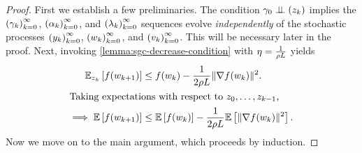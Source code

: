 \estimatingSequenceBound*
\begin{proof}
    First we establish a few preliminaries.
    The condition \( \gamma_0 \perp \!\!\! \perp \left(z_{k}\right) \) implies the \( \left(\gamma_k\right)_{k=0}^\infty \), \( \left(\alpha_k\right)_{k=0}^\infty \), and \( \left(\lambda_k\right)_{k=0}^\infty \) sequences evolve \emph{independently} of the stochastic processes \( \left(y_k\right)_{k=0}^\infty \), \( \left(w_k\right)_{k=0}^\infty \), and \( \left(v_k\right)_{k=0}^\infty \).
    This will be necessary later in the proof.
    Next, invoking \autoref{lemma:sgc-decrease-condition} with \( \eta = \frac{1}{\rho L} \) yields
    \begin{align}
        \mathbb{E}_{z_{k}} \left[f(w_{k+1})\right] &\leq f(w_k) - \frac{1}{2 \rho L} \|\nabla f(w_k)\|^2.\nonumber\\
            \intertext{Taking expectations with respect to \( z_0, \ldots, z_{k-1} \),}
        \implies \mathbb{E} \left[f(w_{k+1})\right] &\leq \mathbb{E}\left[f(w_k)\right] - \frac{1}{2 \rho L} \mathbb{E} \left[\|\nabla f(w_k)\|^2\right].\label{eq:expected-decrease}
    \end{align}
    Now we move on to the main argument, which proceeds by induction.\hfill \break


\end{proof}
